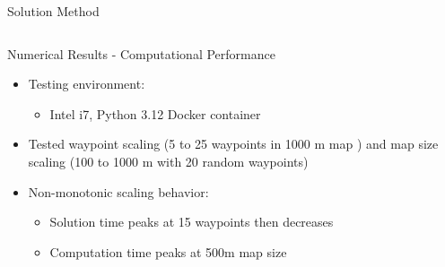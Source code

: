 \documentclass[aspectratio=169,11pt,xcolor={dvipsnames},hyperref={pdftex,pdfpagemode=UseNone,hidelinks,pdfdisplaydoctitle=true},usepdftitle=false]{beamer}
\begin{document}
\begin{frame}{Solution Method}
\begin{columns}
\begin{column}{0.42\textwidth}
      \end{column}
    \end{columns}
    
    
      \end{frame}

      \begin{frame}{Numerical Results - Computational Performance}

        \begin{itemize}
          \item Testing environment: 
            \begin{itemize}
            \item Intel i7, Python 3.12 Docker container
          \end{itemize}
        \item Tested waypoint scaling (5 to 25 waypoints in 1000 m map ) and map size scaling (100 to 1000 m with 20 random waypoints)
        \item Non-monotonic scaling behavior:
          \begin{itemize}
            \item Solution time peaks at 15 waypoints then decreases
            \item Computation time peaks at 500m map size
          \end{itemize}
      \end{itemize}
      

\end{frame}
\end{document}
